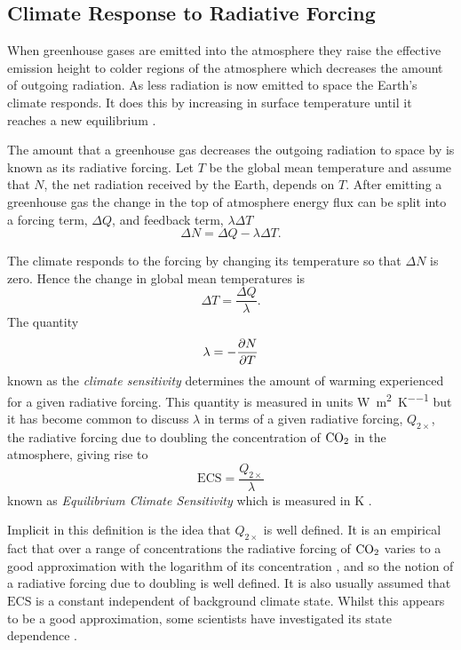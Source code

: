 \subsection{Climate Response to Radiative Forcing}
When greenhouse gases are emitted into the atmosphere they raise the effective emission height to colder regions of the atmosphere which
decreases the amount of outgoing radiation. As less radiation is now emitted to space the Earth's climate responds. It does this by increasing in surface temperature
until it reaches a new equilibrium \parencite{Manabe1967,Pierrehumbert2010}. 

The amount that a greenhouse gas decreases the outgoing radiation to space by is known as its radiative forcing. Let $T$ be
the global mean temperature and assume that $N$, the net radiation received by the Earth, depends on $T$. After emitting a greenhouse gas
the change in the top of atmosphere energy flux can be split \parencite{Gregory2004} into a forcing term, $\Delta Q$, and feedback term, $\lambda \Delta T$
\begin{equation}
  \label{eq:deltaN}
  \Delta N = \Delta Q - \lambda \Delta T.
\end{equation}

The climate responds to the forcing by changing its temperature so that $\Delta N$ is zero. Hence the change in global mean temperatures is
\begin{equation}
  \label{eq:response_to_radiative_forcing}
  \Delta T = \frac{\Delta Q}{\lambda}.
\end{equation}
The quantity
\begin{equation}
  \label{eq:climate_sensitivity}
  \lambda = -\pdv{N}{T}
\end{equation}
known as the \emph{climate sensitivity} determines the amount of warming experienced for a given radiative forcing. This quantity is measured
in units \si{\watt\per\square\meter\per\kelvin} but it has become common to discuss $\lambda$ in terms of a given radiative forcing, $Q_{2\times}$,
the radiative forcing due to doubling the concentration of $\ce{CO2}$ in the atmosphere, giving rise to
\begin{equation}
  \label{eq:definition_of_ECS}
  \mathrm{ECS} = \frac{Q_{2\times}}{\lambda}
\end{equation}
known as \emph{Equilibrium Climate Sensitivity} which is measured in \si{\kelvin} \parencite{Charney1979}.

Implicit in this definition is the idea that $Q_{2\times}$ is well defined. It is an empirical fact that over a range of concentrations the radiative forcing
of $\ce{CO2}$ varies to a good approximation with the logarithm of its concentration \parencite{Pierrehumbert2010}, and so the notion of a radiative forcing due to doubling is well defined.
It is also usually assumed that $\mathrm{ECS}$ is a constant independent of background climate state. Whilst this appears to be a good approximation, some scientists
have investigated its state dependence \parencite{Ashwin2019,Caballero2013,Bloch-Johnson2021}.

